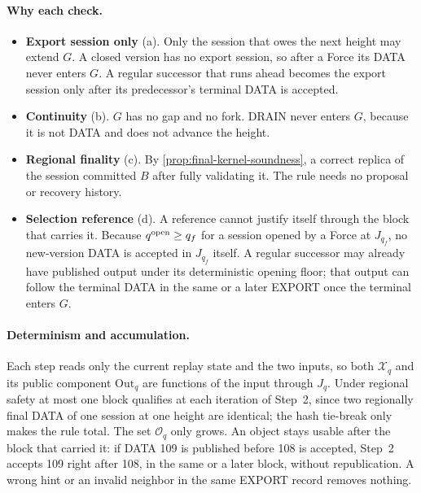 \documentclass[11pt,a4paper]{article}
\begin{document}
\paragraph{Why each check.}
\begin{itemize}[itemsep=2pt]
\item \textbf{Export session only} (a). Only the session that owes the
next height may extend $G$. A closed version has no export session, so
after a Force its DATA never enters $G$. A regular successor that runs
ahead becomes the export session only after its predecessor's terminal
DATA is accepted.
\item \textbf{Continuity} (b). $G$ has no gap and no fork. DRAIN never
enters $G$, because it is not DATA and does not advance the height.
\item \textbf{Regional finality} (c). By
\cref{prop:final-kernel-soundness}, a correct replica of the session
committed $B$ after fully validating it. The rule needs no proposal or
recovery history.
\item \textbf{Selection reference} (d). A reference cannot justify itself
through the block that carries it. Because $q^{\rm open}\ge q_f$ for a
session opened by a Force at $J_{q_f}$, no new-version DATA is accepted
in $J_{q_f}$ itself.  A regular successor may already have published
output under its deterministic opening floor; that output can follow the
terminal DATA in the same or a later EXPORT once the terminal enters
$G$.
\end{itemize}

\paragraph{Determinism and accumulation.}
Each step reads only the current replay state and the two inputs, so both
$\mathcal X_q$ and its public component $\mathrm{Out}_q$ are functions of
the input through $J_q$. Under regional
safety at most one block qualifies at each iteration of Step~2, since two regionally final
DATA of one session at one height are identical; the hash tie-break only
makes the rule total. The set $\mathcal O_q$ only grows. An object stays
usable after the block that carried it: if DATA 109 is published before
108 is accepted, Step~2 accepts 109 right after 108, in the same or a
later block, without republication. A wrong hint or an invalid neighbor
in the same EXPORT record removes nothing.
\end{document}
